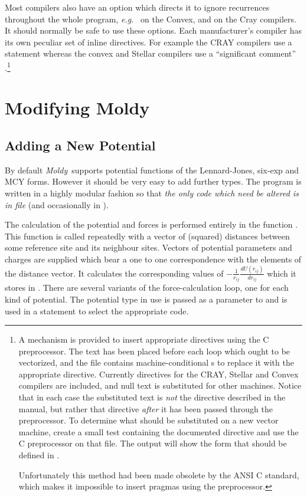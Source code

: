 \documentclass[a4paper,twoside]{report}
\newcommand{\moldy}{\emph{Moldy}}
\newcommand{\eg}{\emph{e.g.}}
\begin{document}
Most compilers also have an option which directs it to ignore
recurrences throughout the whole program, \eg\  on the
Convex,  and  on the Cray compilers.  It
should normally be safe to use these options. Each manufacturer's
compiler has its own peculiar set of inline directives.  For example
the CRAY compilers use a ~ statement
whereas the convex and Stellar compilers use a ``significant comment''
.\footnote{A mechanism is
  provided to insert appropriate directives using the C preprocessor.
  The text  has been placed before each loop which
  ought to be vectorized, and the file  contains
  machine-conditional s to replace it with the
  appropriate directive.  Currently directives for the CRAY, Stellar
  and Convex compilers are included, and null text is substituted for
  other machines.  Notice that in each case the substituted text is
  \emph{not} the directive described in the manual, but rather that
  directive \emph{after} it has been passed through the preprocessor.
  To determine what should be substituted on a new vector machine,
  create a small test containing the documented directive and use the
  C preprocessor on that file. The output will show the form that
  should be defined in .
  
  Unfortunately this method had been made obsolete by the ANSI C standard,
  which makes it impossible to insert pragmas using the
  preprocessor. } 

\section{Modifying Moldy}%
\subsection{Adding a New Potential}
\label{sec:newpot}
By default \moldy\ supports potential functions of the Lennard-Jones,
six-exp and MCY forms.  However it should be very easy to add further
types. The program is written in a highly modular fashion so that
\emph{the only code which need be altered is in file }
(and occasionally in ).

The calculation of the potential and forces is performed entirely in
the function .  This function is called repeatedly with
a vector of (squared) distances between some reference site and its
neighbour sites.  Vectors of potential parameters and charges are
supplied which bear a one to one correspondence with the elements of
the distance vector.  It calculates the corresponding values of
$-\frac{1}{r_{ij}}\frac{dU(r_{ij})}{dr_{ij}}$ which it stores in
.  There are several variants of the force-calculation
loop, one for each kind of potential.  The potential type in use is
passed as a parameter to  and is used in a 
statement to select the appropriate code.
\end{document}
